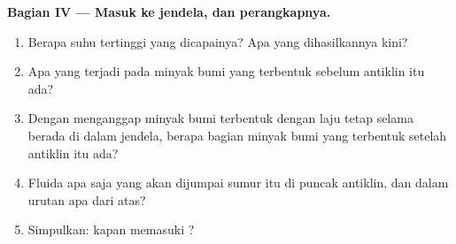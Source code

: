 \begin{problem}
\medskip
\noindent\textbf{Bagian IV --- Masuk ke jendela, dan perangkapnya.}
\begin{enumerate}[resume]
  \item Berapa suhu tertinggi yang dicapainya? Apa yang dihasilkannya kini?
  \item Apa yang terjadi pada minyak bumi yang terbentuk sebelum antiklin itu
        ada?
  \item Dengan menganggap minyak bumi terbentuk dengan laju tetap selama  berada di dalam jendela, berapa bagian minyak bumi yang terbentuk
        setelah antiklin itu ada?
  \item Fluida apa saja yang akan dijumpai sumur itu di puncak antiklin, dan
        dalam urutan apa dari atas?
  \item Simpulkan: kapan  memasuki ?
\end{enumerate}
\end{problem}
